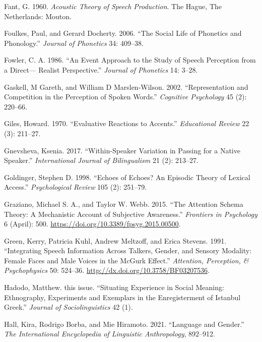 \documentclass[
  letterpaper,
  DIV=11,
  numbers=noendperiod]{scrartcl}
\newlength{\cslhangindent}
\newenvironment{CSLReferences}[2] %
 {\begin{list}{}{%
  \setlength{\itemindent}{0pt}
  \setlength{\leftmargin}{0pt}
  \setlength{\parsep}{0pt}
  \ifodd #1
   \setlength{\leftmargin}{\cslhangindent}
   \setlength{\itemindent}{-1\cslhangindent}
  \fi
  \setlength{\itemsep}{#2\baselineskip}}}
 {\end{list}}
\begin{document}
\begin{CSLReferences}{1}{0}
Fant, G. 1960. \emph{Acoustic Theory of Speech Production}. The Hague,
The Netherlands: Mouton.

Foulkes, Paul, and Gerard Docherty. 2006. {``The Social Life of
Phonetics and Phonology.''} \emph{Journal of Phonetics} 34: 409--38.

Fowler, C. A. 1986. {``An Event Approach to the Study of Speech
Perception from a Direct--- Realist Perspective.''} \emph{Journal of
Phonetics} 14: 3--28.

Gaskell, M Gareth, and William D Marslen-Wilson. 2002. {``Representation
and Competition in the Perception of Spoken Words.''} \emph{Cognitive
Psychology} 45 (2): 220--66.

Giles, Howard. 1970. {``Evaluative Reactions to Accents.''}
\emph{Educational Review} 22 (3): 211--27.

Gnevsheva, Ksenia. 2017. {``Within-Speaker Variation in Passing for a
Native Speaker.''} \emph{International Journal of Bilingualism} 21 (2):
213--27.

Goldinger, Stephen D. 1998. {``Echoes of Echoes? An Episodic Theory of
Lexical Access.''} \emph{Psychological Review} 105 (2): 251--79.

Graziano, Michael S. A., and Taylor W. Webb. 2015. {``The Attention
Schema Theory: A Mechanistic Account of Subjective Awareness.''}
\emph{Frontiers in Psychology} 6 (April): 500.
\url{https://doi.org/10.3389/fpsyg.2015.00500}.

Green, Kerry, Patricia Kuhl, Andrew Meltzoff, and Erica Stevens. 1991.
{``Integrating Speech Information Across Talkers, Gender, and Sensory
Modality: Female Faces and Male Voices in the McGurk Effect.''}
\emph{Attention, Perception, \& Psychophysics} 50: 524--36.
\url{http://dx.doi.org/10.3758/BF03207536}.

Hadodo, Matthew. this issue. {``Situating Experience in Social Meaning:
Ethnography, Experiments and Exemplars in the Enregisterment of Istanbul
Greek.''} \emph{Journal of Sociolinguistics} 42 (1).

Hall, Kira, Rodrigo Borba, and Mie Hiramoto. 2021. {``Language and
Gender.''} \emph{The International Encyclopedia of Linguistic
Anthropology}, 892--912.


\end{CSLReferences}
\end{document}
